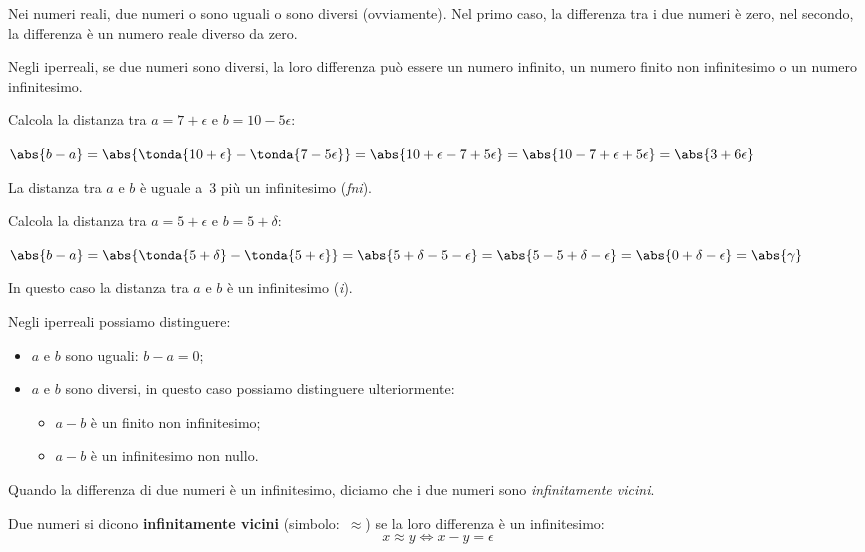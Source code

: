 
Nei numeri reali, due numeri o sono uguali o sono diversi (ovviamente).
Nel primo caso, la differenza tra i due numeri è zero, 
nel secondo, la differenza è un numero reale diverso da zero.

Negli iperreali, se due numeri sono diversi, la loro differenza può 
essere un numero infinito, un numero finito non infinitesimo o un numero 
infinitesimo.

\begin{esempio}
 Calcola la distanza tra \(a=7+\epsilon\) e \(b=10-5\epsilon\):
 
 \(\abs{b-a}=\abs{\tonda{10+\epsilon} - \tonda{7-5\epsilon}}=
   \abs{10+\epsilon - 7+5\epsilon}=
   \abs{10-7 + \epsilon+5\epsilon}=
   \abs{3 + 6\epsilon}
 \)
 
La distanza tra \(a\) e \(b\) è uguale a~3 più un infinitesimo 
(\emph{fni}).
\end{esempio}

\begin{esempio}
 Calcola la distanza tra \(a=5+\epsilon\) e \(b=5+\delta\):
 
 \(\abs{b-a}=\abs{\tonda{5+\delta} - \tonda{5+\epsilon}}=
   \abs{5+\delta - 5-\epsilon}=
   \abs{5-5 + \delta - \epsilon}=
   \abs{0 + \delta - \epsilon} = \abs{\gamma}
 \)
 
 In questo caso la distanza tra \(a\) e \(b\) è un infinitesimo 
(\emph{i}).
\end{esempio}

\noindent Negli iperreali possiamo distinguere:

\begin{itemize} [noitemsep]
 \item \(a\) e \(b\) sono uguali: \(b-a=0\);
 \item \(a\) e \(b\) sono diversi, in questo caso possiamo distinguere
 ulteriormente:
\begin{itemize} [nosep]
 \item \(a-b\) è un finito non infinitesimo;
 \item \(a-b\) è un infinitesimo non nullo.
\end{itemize}
\end{itemize}

Quando la differenza di due numeri è un infinitesimo, diciamo 
che i due numeri sono \emph{infinitamente vicini}.

\begin{definizione}    %
Due numeri si dicono \textbf{infinitamente vicini} (simbolo:~\(\approx\)) se 
la loro differenza è un infinitesimo:
\[x \approx y \Leftrightarrow x - y = \epsilon\]
\end{definizione}

